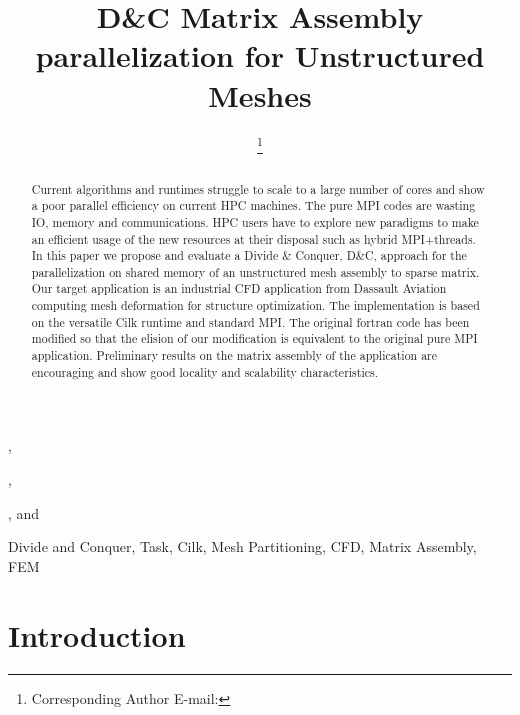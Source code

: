 \documentclass{IOS-Book-Article}
\begin{document}
\begin{frontmatter}              %

\title{D\&C Matrix Assembly parallelization for Unstructured Meshes}

\author[A]{ %
\thanks{Corresponding Author E-mail: }},
\author[A]{ },
\author[A]{ },
and
\author[B]{ }

\address[A]{PRISM - University of Versailles, France}
\address[B]{Dassault Aviation, Saint-Cloud, France}

\begin{abstract}
Current algorithms and runtimes struggle to scale to a large number of cores and show a poor parallel efficiency on current HPC machines.
The pure MPI codes are wasting IO, memory and communications. HPC users have to explore new paradigms to make an efficient usage of the new resources at their disposal such as hybrid MPI+threads.
In this paper we propose and evaluate a Divide \& Conquer, D\&C, approach for the parallelization on shared memory of an unstructured mesh assembly to sparse matrix.
Our target application is an industrial CFD application from Dassault Aviation computing mesh deformation for structure optimization.
The implementation is based on the versatile Cilk runtime and standard MPI. The original fortran code has been modified so that the elision of our modification is equivalent to the original pure MPI application.
Preliminary results on the matrix assembly of the application are encouraging and show good locality and scalability characteristics.
\end{abstract}

\begin{keyword}
Divide and Conquer, Task, Cilk, Mesh Partitioning, CFD, Matrix Assembly, FEM
\end{keyword}
\end{frontmatter}

\thispagestyle{empty}
\pagestyle{empty}

\section{Introduction}
\end{document}
